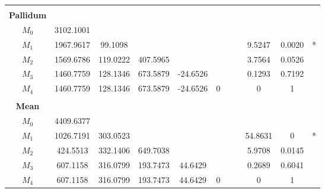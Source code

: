 \documentclass[11pt]{article}
\begin{document}
\begin{table}[htbp]
{\begin{tabular}{ccccccccccc}
\hline
\rule{0pt}{3pt} \\ 
\textbf{Pallidum} &  &  &  &  &  &  &  &  &  &  \\
$M_0$     & 3102.1001&  &  &  &  &  &  &  &  &  \\
$M_1$     & 1967.9617& 99.1098 &  &  &  &  &  & 9.5247 & 0.0020 & * \\
$M_2$    & 1569.6786 & 119.0222 & 407.5965 &  &  &  &  &3.7564 & 0.0526 &  \\
$M_3$    & 1460.7759 & 128.1346 & 673.5879 & -24.6526 &  &  &  & 0.1293 & 0.7192 &  \\
$M_4$     & 1460.7759 & 128.1346 & 673.5879 & -24.6526 & 0 &  &  & 0 & 1 &  \\

\hline
\rule{0pt}{3pt} \\  
\textbf{Mean} &  &  &  &  &  &  &  &  &  &  \\
$M_0$     & 4409.6377 &  &  &  &  &  &  &  &  &  \\
$M_1$     & 1026.7191 & 303.0523 &  &  &  &  &  & 54.8631 & 0& * \\
$M_2$     & 424.5513 & 332.1406& 649.7038 &  &  &  &  & 5.9708 & 0.0145 &  \\
$M_3$     & 607.1158 & 316.0799 &193.7473 & 44.6429 &  &  &  & 0.2689 &0.6041 &  \\
$M_4$     & 607.1158 & 316.0799 &193.7473 & 44.6429 & 0 &  &  & 0 &1 &  \\

\bottomrule
\end{tabular}
}
\end{table}
\end{document}
